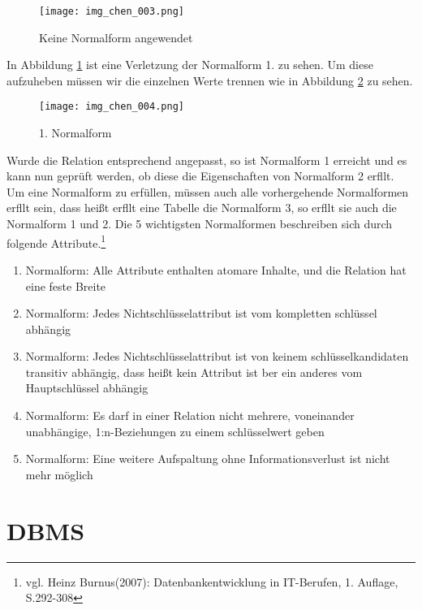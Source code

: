 \begin{figure}[H]
\begin{center}
\texttt{[image: img\_chen\_003.png]}
\caption{Keine Normalform angewendet}
\label{chenpic4}
\end{center}
\end{figure}



In Abbildung \ref{chenpic4} ist eine Verletzung der Normalform 1. zu sehen. Um diese aufzuheben müssen wir die einzelnen Werte trennen wie in Abbildung \ref{chenpic5} zu sehen.

\begin{figure}[H]
\begin{center}
\texttt{[image: img\_chen\_004.png]}
\caption{1. Normalform}
\label{chenpic5}
\end{center}
\end{figure}

Wurde die Relation entsprechend angepasst, so ist Normalform 1 erreicht und es kann nun geprüft werden,
ob diese die Eigenschaften von Normalform 2 erfllt. Um eine Normalform zu erfüllen, müssen auch alle vorhergehende Normalformen erfllt sein, dass heißt erfllt eine Tabelle die Normalform 3, so erfllt sie auch die Normalform 1 und 2.
Die 5 wichtigsten Normalformen beschreiben sich durch folgende Attribute.\footnote{vgl. Heinz Burnus(2007): Datenbankentwicklung in IT-Berufen, 1. Auflage, S.292-308}

\begin{enumerate}
\item Normalform: Alle Attribute enthalten atomare Inhalte, und die Relation hat eine feste Breite
\item Normalform: Jedes Nichtschlüsselattribut ist vom kompletten schlüssel abhängig
\item Normalform: Jedes Nichtschlüsselattribut ist von keinem schlüsselkandidaten transitiv abhängig, dass heißt kein Attribut ist ber ein anderes vom Hauptschlüssel abhängig
\item Normalform: Es darf in einer Relation nicht mehrere, voneinander unabhängige, 1:n-Beziehungen zu einem schlüsselwert geben
\item Normalform: Eine weitere Aufspaltung ohne Informationsverlust ist nicht mehr möglich
\end{enumerate}



\section{DBMS}
\label{sec:dbms}


